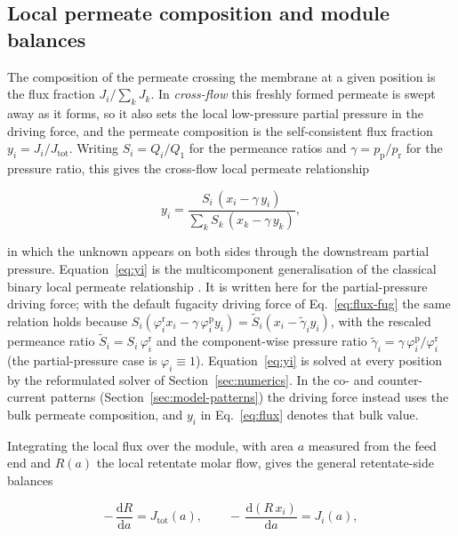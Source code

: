 \documentclass[a4paper,fleqn]{cas-dc}
\begin{document}
\subsection{Local permeate composition and module balances}\label{sec:model-balances}
The composition of the permeate crossing the membrane at a given position is the
flux fraction $J_i/\sum_k J_k$. In \emph{cross-flow} this freshly formed permeate
is swept away as it forms, so it also sets the local low-pressure partial pressure
in the driving force, and the permeate composition is the self-consistent flux
fraction $y_i = J_i/J_\mathrm{tot}$. Writing $S_i = Q_i/Q_1$ for the permeance
ratios and $\gamma = p_\mathrm{p}/p_\mathrm{r}$ for the pressure ratio, this gives
the cross-flow local permeate relationship

\begin{equation}\label{eq:yi}
y_i = \frac{S_i\,(x_i - \gamma\,y_i)}{\sum_k S_k\,(x_k - \gamma\,y_k)},
\end{equation}

in which the unknown appears on both sides through the downstream partial
pressure. Equation~\eqref{eq:yi} is the multicomponent generalisation of the
classical binary local permeate relationship \citep{weller1950}. It is written
here for the partial-pressure driving force; with the default fugacity driving
force of Eq.~\eqref{eq:flux-fug} the same relation holds because
$S_i(\varphi_i^{\mathrm{r}} x_i - \gamma\,\varphi_i^{\mathrm{p}} y_i) =
\tilde{S}_i(x_i - \tilde{\gamma}_i y_i)$, with the rescaled permeance ratio
$\tilde{S}_i = S_i\,\varphi_i^{\mathrm{r}}$ and the component-wise pressure ratio
$\tilde{\gamma}_i = \gamma\,\varphi_i^{\mathrm{p}}/\varphi_i^{\mathrm{r}}$ (the
partial-pressure case is $\varphi_i \equiv 1$). Equation~\eqref{eq:yi} is solved
at every position by the reformulated solver of Section~\ref{sec:numerics}. In the
co- and counter-current patterns (Section~\ref{sec:model-patterns}) the driving
force instead uses the bulk permeate composition, and $y_i$ in
Eq.~\eqref{eq:flux} denotes that bulk value.

Integrating the local flux over the module, with area $a$ measured from the feed
end and $R(a)$ the local retentate molar flow, gives the general retentate-side
balances

\begin{equation}\label{eq:mass-balance}
-\,\frac{\mathrm{d}R}{\mathrm{d}a} = J_\mathrm{tot}(a), \qquad
-\,\frac{\mathrm{d}(R\,x_i)}{\mathrm{d}a} = J_i(a),
\end{equation}
\end{document}
